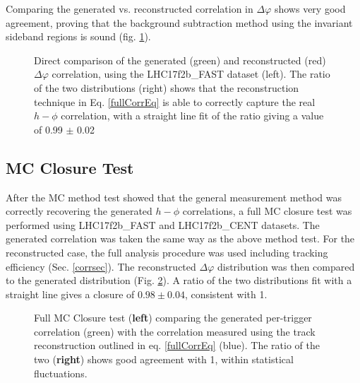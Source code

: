 \documentclass[ALICE,manyauthors]{ALICE_analysis_notes}
\begin{document}
Comparing the generated vs. reconstructed correlation in $\Delta\varphi$ shows very good agreement, proving that the background subtraction method using the invariant sideband regions is sound (fig. \ref{methodtestFAST}).

\begin{figure}[ht]
\centering
\begin{subfigure}{
\texttt{[image: images/truevsmethod.pdf]}}
\end{subfigure}
\begin{subfigure}{
\texttt{[image: images/ratio\_method-true\_fit.pdf]}}
\end{subfigure}
\caption{Direct comparison of the generated (green) and reconstructed (red) $\Delta\varphi$ correlation, using the LHC17f2b\_FAST dataset (left). The ratio of the two distributions (right) shows that the reconstruction technique in Eq. \ref{fullCorrEq} is able to correctly capture the real $h-\phi$ correlation, with a straight line fit of the ratio giving a value of 0.99 $\pm$ 0.02}
\label{methodtestFAST}
\end{figure}

\subsection{MC Closure Test}

After the MC method test showed that the general measurement method was correctly recovering the generated $h-\phi$ correlations, a full MC closure test was performed using LHC17f2b\_FAST and LHC17f2b\_CENT datasets.  The generated correlation was taken the same way as the above method test.  For the reconstructed case, the full analysis procedure was used including tracking efficiency (Sec. \ref{corrsec}).  The reconstructed $\Delta\varphi$ distribution was then compared to the generated distribution (Fig. \ref{MCClosureFAST}).  A ratio of the two distributions fit with a straight line gives a closure of $0.98\pm 0.04$, consistent with 1.

\begin{figure}[ht]
\centering
\begin{subfigure}{
\texttt{[image: images/truevsrecon\_notrigger.pdf]}}
\end{subfigure}
\begin{subfigure}{
\texttt{[image: images/ratio\_recon-true\_notrigger.pdf]}}
\end{subfigure}
\caption{Full MC Closure test (\textbf{left}) comparing the generated per-trigger correlation (green) with the correlation measured using the track reconstruction outlined in eq. \ref{fullCorrEq} (blue). The ratio of the two (\textbf{right}) shows good agreement with 1, within statistical fluctuations.}
\label{MCClosureFAST}
\end{figure}
\end{document}
